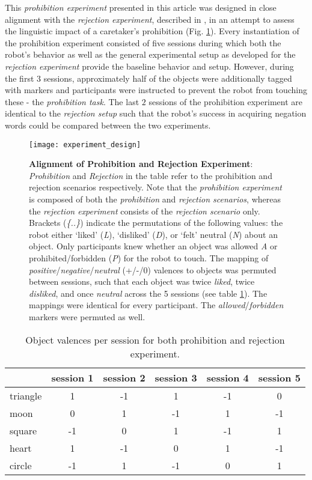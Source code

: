 This \emph{prohibition experiment} presented in this article was designed in close alignment with the \emph{rejection experiment}, described in 
\cite{Foerster2017}, in an attempt to assess the linguistic impact of a caretaker's prohibition (Fig. \ref{fig_study_design}). 
Every instantiation of the prohibition experiment consisted of five sessions during which both the robot's behavior as well as the general experimental setup as developed for
 the \emph{rejection experiment} provide the baseline behavior and setup. However, during the first $3$ sessions, approximately half of the 
objects were additionally tagged with markers and  participants were instructed to prevent the robot from touching these - the \emph{prohibition task}. The last 
$2$ sessions of the prohibition experiment are identical to the \emph{rejection setup} such that the robot's success in acquiring negation words could
be compared between the two experiments.
\begin{figure}
  \begin{center}
\texttt{[image: experiment\_design]}
  \end{center}
  \caption{\textbf{Alignment of Prohibition and Rejection Experiment}: \emph{Prohibition} and \emph{Rejection} in the table refer to the prohibition and 
    rejection scenarios respectively. Note that the \emph{prohibition experiment} is composed of both the \emph{prohibition} and \emph{rejection scenarios},
    whereas the \emph{rejection experiment} consists of the \emph{rejection scenario} only.
    Brackets (\textit{\{..\}}) indicate the permutations of the following values: the robot either `liked' (\textit{L}), `disliked' (\textit{D}), or `felt'
    neutral (\textit{N}) about an object. Only participants knew whether an object was allowed \textit{A} or prohibited/forbidden (\textit{P}) for the
    robot to touch. The mapping of \textit{positive}/\textit{negative}/\textit{neutral} (+/-/0) valences to objects was permuted between sessions, such that
    each object was twice \textit{liked}, twice \textit{disliked}, and once \textit{neutral} across the 5 sessions (see table \ref{tbl_mot_values}).
    The mappings were identical for every participant. The \textit{allowed}/\textit{forbidden} markers were permuted as well.}
  \label{fig_study_design}
\end{figure}

\begin{table}
  \caption{Object valences per session for both prohibition and rejection experiment.}
  \label{tbl_mot_values}
  \begin{tabular}{@{\extracolsep{\fill}}lccccc}
    \hline
    & session 1 & session 2 & session 3 & session 4 & session 5\\
    \hline
    triangle & 1 & -1 & 1 & -1 & 0\\
    \hline
    moon & 0 & 1 & -1 & 1 & -1\\
    \hline
    square & -1 & 0 & 1 & -1 & 1\\
    \hline
    heart & 1 & -1 & 0 & 1 & -1\\
    \hline
    circle & -1 & 1 & -1 & 0 & 1\\
    \hline
  \end{tabular}
\end{table}
